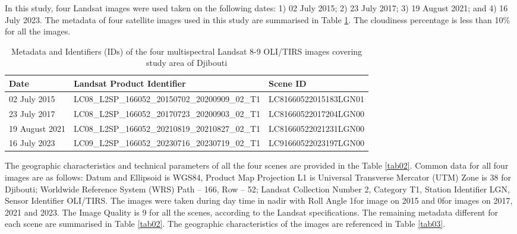 \documentclass[jimaging,article,submit,pdftex,moreauthors]{Definitions/mdpi}
\begin{document}
In this study, four Landsat images were used taken on the following dates: 1) 02 July 2015; 2) 23 July 2017; 3) 19 August 2021; and 4) 16 July 2023. The metadata of four satellite images used in this study are summarised in Table \ref{tab01}. The cloudiness percentage is less than 10\% for all the images. 

\begin{table}[H]
\caption{Metadata and Identifiers (IDs) of the four multispectral Landsat 8-9 OLI/TIRS images covering study area of Djibouti}
\label{tab01}
\setlength\tabcolsep{0pt}
\begin{tabularx}{\textwidth}{ X l X }
\textbf{Date} & \textbf{Landsat Product Identifier} & \textbf{Scene ID} \\
\midrule
	02 July 2015 & LC08\_L2SP\_166052\_20150702\_20200909\_02\_T1 & LC81660522015183LGN01 \\
	23 July 2017 &  LC08\_L2SP\_166052\_20170723\_20200903\_02\_T1 & LC81660522017204LGN00 \\
	19 August 2021 & LC08\_L2SP\_166052\_20210819\_20210827\_02\_T1 & LC81660522021231LGN00 \\
	16 July 2023 & LC09\_L2SP\_166052\_20230716\_20230719\_02\_T1 & LC91660522023197LGN00 \\
\bottomrule
\end{tabularx}
\end{table} 

The geographic characteristics and technical parameters of all the four scenes are provided in the Table \ref{tab02}. Common data for all four images are as follows: Datum and Ellipsoid is WGS84, Product Map Projection L1 is Universal Transverse Mercator (UTM) Zone is 38 for Djibouti;  Worldwide Reference System (WRS) Path -- 166, Row -- 52; Landsat Collection Number 2, Category T1, Station Identifier LGN, Sensor Identifier OLI/TIRS. The images were taken during day time in nadir with Roll Angle 1\degree  for image on 2015 and 0\degree for images on 2017, 2021 and 2023. The Image Quality is 9 for all the scenes, according to the Landsat specifications. The remaining metadata different for each scene are summarised in Table \ref{tab02}. The geographic characteristics of the images are referenced in Table \ref{tab03}. 
\end{document}
